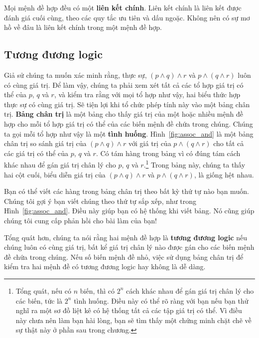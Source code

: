 Mọi mệnh đề hợp đều có một \textbf{liên kết chính}. Liên kết chính là liên kết được đánh giá cuối cùng, theo các quy tắc ưu tiên và dấu ngoặc. Không nên có sự mơ hồ về đâu là liên kết chính trong một mệnh đề hợp.

\subsection{Tương đương logic}

Giả sử chúng ta muốn xác minh rằng, thực sự, $(p \land q) \land r$ và $p \land (q \land r)$ luôn có cùng giá trị. Để làm vậy, chúng ta phải xem xét tất cả các tổ hợp giá trị có thể của $p$, $q$ và $r$, và kiểm tra rằng với mọi tổ hợp như vậy, hai biểu thức hợp thực sự có cùng giá trị. Sẽ tiện lợi khi tổ chức phép tính này vào một bảng chân trị. \textbf{Bảng chân trị} là một bảng cho thấy giá trị của một hoặc nhiều mệnh đề hợp cho mỗi tổ hợp giá trị có thể của các biến mệnh đề chứa trong chúng. Chúng ta gọi mỗi tổ hợp như vậy là một \textbf{tình huống}. Hình~\ref{fig:assoc_and} là một bảng chân trị so sánh giá trị của $(p \land q) \land r$ với giá trị của $p \land (q \land r)$ cho tất cả các giá trị có thể của $p$, $q$ và $r$. Có tám hàng trong bảng vì có đúng tám cách khác nhau để gán giá trị chân lý cho $p$, $q$ và $r$.\footnote{Tổng quát, nếu có $n$ biến, thì có $2^n$ cách khác nhau để gán giá trị chân lý cho các biến, tức là $2^n$ tình huống. Điều này có thể rõ ràng với bạn nếu bạn thử nghĩ ra một sơ đồ liệt kê có hệ thống tất cả các tập giá trị có thể. Vì điều này chưa nên làm bạn hài lòng, bạn sẽ tìm thấy một chứng minh chặt chẽ về sự thật này ở phần sau trong chương.} Trong bảng này, chúng ta thấy hai cột cuối, biểu diễn giá trị của $(p \land q) \land r$ và $p \land (q \land r)$, là giống hệt nhau.

\begin{notebox}
Bạn có thể viết các hàng trong bảng chân trị theo bất kỳ thứ tự nào bạn muốn. Chúng tôi gợi ý bạn viết chúng theo thứ tự sắp xếp, như trong Hình~\ref{fig:assoc_and}. Điều này giúp bạn có hệ thống khi viết bảng. Nó cũng giúp chúng tôi cung cấp phản hồi cho bài làm của bạn!
\end{notebox}

Tổng quát hơn, chúng ta nói rằng hai mệnh đề hợp là \textbf{tương đương logic} nếu chúng luôn có cùng giá trị, bất kể giá trị chân lý nào được gán cho các biến mệnh đề chứa trong chúng. Nếu số biến mệnh đề nhỏ, việc sử dụng bảng chân trị để kiểm tra hai mệnh đề có tương đương logic hay không là dễ dàng.

